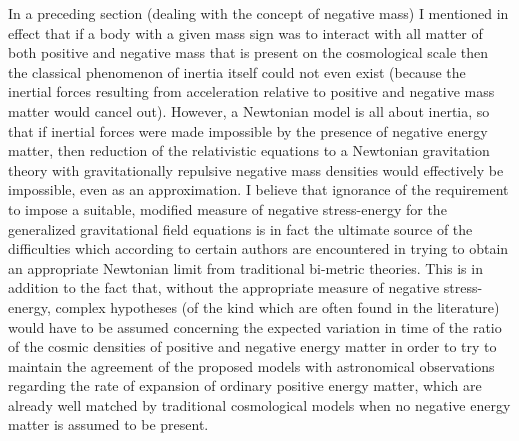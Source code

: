 \documentclass[notitlepage,12pt]{report}
\begin{document}
In a preceding section (dealing with the concept of negative mass) I mentioned in effect that if a body with a given mass sign was to interact with all matter of both positive and negative mass that is present on the cosmological scale then the classical phenomenon of inertia itself could not even exist (because the inertial forces resulting from acceleration relative to positive and negative mass matter would cancel out). However, a Newtonian model is all about inertia, so that if inertial forces were made impossible by the presence of negative energy matter, then reduction of the relativistic equations to a Newtonian gravitation theory with gravitationally repulsive negative mass densities would effectively be impossible, even as an approximation. I believe that ignorance of the requirement to impose a suitable, modified measure of negative stress-energy for the generalized gravitational field equations is in fact the ultimate source of the difficulties which according to certain authors are encountered in trying to obtain an appropriate Newtonian limit from traditional bi-metric theories. This is in addition to the fact that, without the appropriate measure of negative stress-energy, complex hypotheses (of the kind which are often found in the literature) would have to be assumed concerning the expected variation in time of the ratio of the cosmic densities of positive and negative energy matter in order to try to maintain the agreement of the proposed models with astronomical observations regarding the rate of expansion of ordinary positive energy matter, which are already well matched by traditional cosmological models when no negative energy matter is assumed to be present.
\end{document}
